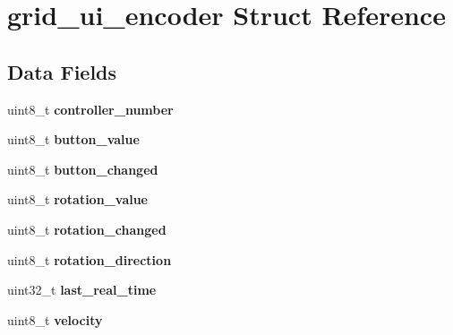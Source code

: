 \hypertarget{structgrid__ui__encoder}{\section{grid\-\_\-ui\-\_\-encoder Struct Reference}
\label{structgrid__ui__encoder}
}
\subsection*{Data Fields}
\begin{DoxyCompactItemize}
\item 
\hypertarget{structgrid__ui__encoder_a8526c4b182b5726db6adcaee070f40b9}{uint8\-\_\-t {\bfseries controller\-\_\-number}}\label{structgrid__ui__encoder_a8526c4b182b5726db6adcaee070f40b9}

\item 
\hypertarget{structgrid__ui__encoder_a646918d69d74923f53fa264f9150f33a}{uint8\-\_\-t {\bfseries button\-\_\-value}}\label{structgrid__ui__encoder_a646918d69d74923f53fa264f9150f33a}

\item 
\hypertarget{structgrid__ui__encoder_a8b5e35706e0e92784d0fe5bb8f858c85}{uint8\-\_\-t {\bfseries button\-\_\-changed}}\label{structgrid__ui__encoder_a8b5e35706e0e92784d0fe5bb8f858c85}

\item 
\hypertarget{structgrid__ui__encoder_a9cda624eea0725e65e7e5b7dc4257c58}{uint8\-\_\-t {\bfseries rotation\-\_\-value}}\label{structgrid__ui__encoder_a9cda624eea0725e65e7e5b7dc4257c58}

\item 
\hypertarget{structgrid__ui__encoder_a0bb763f12f7795fab43123094e73517b}{uint8\-\_\-t {\bfseries rotation\-\_\-changed}}\label{structgrid__ui__encoder_a0bb763f12f7795fab43123094e73517b}

\item 
\hypertarget{structgrid__ui__encoder_a1b7bfba7cdf89589f6d95620bebcb92c}{uint8\-\_\-t {\bfseries rotation\-\_\-direction}}\label{structgrid__ui__encoder_a1b7bfba7cdf89589f6d95620bebcb92c}

\item 
\hypertarget{structgrid__ui__encoder_a6c770913186af3f430ad72b54192c69d}{uint32\-\_\-t {\bfseries last\-\_\-real\-\_\-time}}\label{structgrid__ui__encoder_a6c770913186af3f430ad72b54192c69d}

\item 
\hypertarget{structgrid__ui__encoder_ad5d82450449010f607caaa55cf5deb3d}{uint8\-\_\-t {\bfseries velocity}}\label{structgrid__ui__encoder_ad5d82450449010f607caaa55cf5deb3d}


\end{DoxyCompactItemize}
